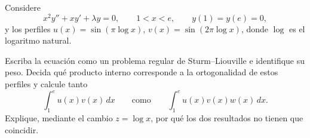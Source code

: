 Considere
\[
x^2y''+xy'+\lambda y=0,\qquad 1<x<e,\qquad y(1)=y(e)=0,
\]
y los perfiles \(u(x)=\sin(\pi\log x)\), \(v(x)=\sin(2\pi\log x)\), donde \(\log\) es el logaritmo natural.

Escriba la ecuación como un problema regular de Sturm--Liouville e identifique su peso. Decida qué producto interno corresponde a la ortogonalidad de estos perfiles y calcule tanto
\[
\int_1^e u(x)v(x)\,dx
\qquad\text{como}\qquad
\int_1^e u(x)v(x)w(x)\,dx.
\]
Explique, mediante el cambio \(z=\log x\), por qué los dos resultados no tienen que coincidir.
